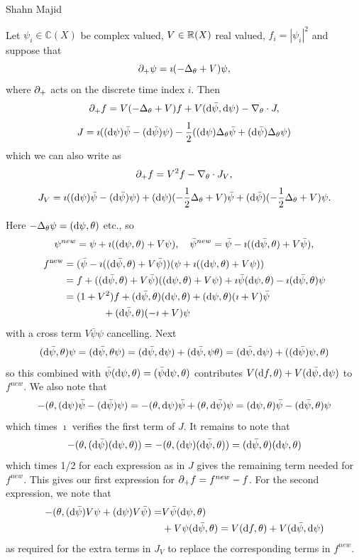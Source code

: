 \begin{artengenv}{Shahn Majid}
\begin{proposition}\label{propsch} Let $\psi_i\in \mathbb{C}(X)$ be complex valued, $V\in {\mathbb{R}}(X)$ real valued, $f_i=|\psi_i|^2$ and suppose that
\[ {\partial}_+\psi = \imath(-\Delta_\theta + V)\psi, \]
where ${\partial}_+$ acts on the discrete time index $i$. Then
\[ {\partial}_+ f= V(-\Delta_\theta +V)f+ V({\rm d}\bar\psi,{\rm d} \psi)-\nabla_\theta\cdot J,\]
\[ J=\imath(({\rm d}\psi)\bar\psi-({\rm d}\bar\psi)\psi)-{1\over 2}(({\rm d}\psi)\Delta_\theta\bar\psi+({\rm d}\bar\psi)\Delta_\theta\psi)\]
which we can also write as
\[{\partial}_+ f = V^2 f-\nabla_\theta\cdot J_V,\]
\[ J_V=\imath(({\rm d}\psi)\bar\psi-({\rm d}\bar\psi)\psi)+({\rm d}\psi)(-{1\over 2}\Delta_\theta+V)\bar\psi+({\rm d}\bar\psi)(-{1\over 2}\Delta_\theta+V)\psi.\]
\end{proposition}
\proof Here $-\Delta_\theta \psi=({\rm d}\psi,\theta)$ etc., so 
\[ \psi^{new}=\psi+ \imath(({\rm d}\psi,\theta)+V\psi),\quad \bar\psi^{new}=\bar\psi- \imath(({\rm d}\bar\psi,\theta)+V\bar\psi),\]
\begin{align*}
f^{\rm new}&=(\bar\psi- \imath(({\rm d}\bar\psi,\theta)+V\bar\psi))(\psi+ \imath(({\rm d}\psi,\theta)+V\psi))\\
&=f+ (({\rm d}\bar\psi,\theta)+V\bar\psi)(({\rm d}\psi,\theta)+V\psi) + \imath \bar\psi ({\rm d}\psi,\theta)- \imath({\rm d}\bar\psi,\theta)\psi\\
&=(1+V^2)f+ ({\rm d}\bar\psi,\theta)({\rm d}\psi,\theta)+ ({\rm d}\psi,\theta)(\imath+ V)\bar\psi\\
&\qquad\qquad + ({\rm d}\bar\psi,\theta)(-\imath+V)\psi
\end{align*}
with a cross term $V\bar\psi\psi$ cancelling. Next
\[ ({\rm d} \bar\psi,\theta)\psi=({\rm d}\bar\psi,\theta\psi)=({\rm d}\bar\psi,{\rm d}\psi)+({\rm d}\bar\psi,\psi \theta)= ({\rm d}\bar\psi,{\rm d}\psi)+(({\rm d}\bar\psi)\psi, \theta)\]
so this combined with $\bar\psi({\rm d} \psi,\theta)=(\bar\psi{\rm d} \psi,\theta)$ contributes $V({\rm d} f,\theta)+ V({\rm d}\bar\psi,{\rm d}\psi)$ to $f^{new}$. We also note that
\[- (\theta, ({\rm d}\psi)\bar\psi- ({\rm d}\bar\psi)\psi)= - (\theta,{\rm d}\psi)\bar\psi+(\theta,{\rm d}\bar\psi)\psi=({\rm d}\psi,\theta)\bar\psi-({\rm d}\bar\psi,\theta)\psi\]
which times $\imath$ verifies the first term of $J$. It remains to note that
\[ -(\theta,({\rm d}\bar\psi)({\rm d}\psi,\theta))=-(\theta,({\rm d}\psi)({\rm d}\bar\psi,\theta))=({\rm d}\bar\psi,\theta)({\rm d}\psi,\theta)\]
which times 1/2 for each expression as in $J$ gives the remaining term needed for $f^{new}$. This gives our first expression for ${\partial}_+f=f^{new}-f$. For the second expression, we note that
\begin{align*}
-(\theta, ({\rm d}\bar\psi)V\psi+({\rm d}\psi)V\bar\psi)=&V\bar\psi({\rm d}\psi,\theta)\\
&+V\psi({\rm d}\bar\psi,\theta)=V({\rm d} f,\theta)+V({\rm d}\bar\psi,{\rm d}\psi)
\end{align*}
as required for the extra terms in $J_V$ to replace the corresponding terms in $f^{new}$. \endproof


\end{artengenv}
